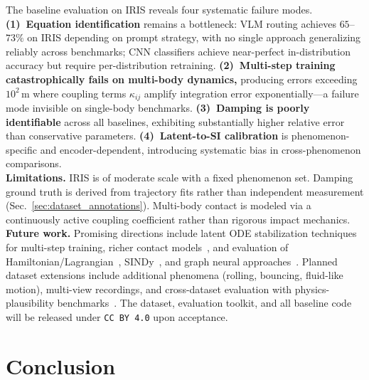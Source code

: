\documentclass[runningheads]{llncs}
\begin{document}
The baseline evaluation on IRIS reveals four systematic failure modes.
\textbf{(1)~Equation identification} remains a bottleneck: VLM routing achieves $65$--$73\%$ on IRIS depending on prompt strategy, with no single approach generalizing reliably across benchmarks; CNN classifiers achieve near-perfect in-distribution accuracy but require per-distribution retraining.
\textbf{(2)~Multi-step training catastrophically fails on multi-body dynamics,} producing errors exceeding $10^2$\,m where coupling terms $\kappa_{ij}$ amplify integration error exponentially---a failure mode invisible on single-body benchmarks.
\textbf{(3)~Damping is poorly identifiable} across all baselines, exhibiting substantially higher relative error than conservative parameters.
\textbf{(4)~Latent-to-SI calibration} is phenomenon-specific and encoder-dependent, introducing systematic bias in cross-phenomenon comparisons.
\\
\noindent
\textbf{Limitations.} IRIS is of moderate scale with a fixed phenomenon set. Damping ground truth is derived from trajectory fits rather than independent measurement (Sec.~\ref{sec:dataset_annotations}). Multi-body contact is modeled via a continuously active coupling coefficient rather than rigorous impact mechanics.
\\
\noindent
\textbf{Future work.} Promising directions include latent ODE stabilization techniques~\cite{finlay2020trainneuralodeworld, wang2021learningsolutionoperatorparametric} for multi-step training, richer contact models~\cite{wang2026contact, song2024diffsim}, and evaluation of Hamiltonian/Lagrangian~\cite{greydanus2019hamiltonian, cranmer2020lagrangian}, SINDy~\cite{brunton2016discovering}, and graph neural approaches~\cite{sanchez2020learning}. Planned dataset extensions include additional phenomena (rolling, bouncing, fluid-like motion), multi-view recordings, and cross-dataset evaluation with physics-plausibility benchmarks~\cite{zhang2025morpheus, guo2025rbench, liang2025worldlens}. The dataset, evaluation toolkit, and all baseline code will be released under \texttt{CC BY 4.0} upon acceptance.


\section{Conclusion}
\label{sec:conclusion}
\end{document}
